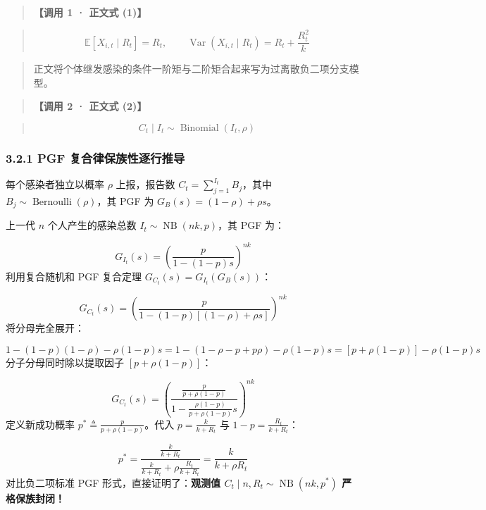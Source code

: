 \documentclass[11pt,a4paper]{ctexart}
\begin{document}
\begin{quote}\small\color{black!75}
\textbf{【调用 1 · 正文式 (1)】}
\end{quote}
\begin{quote}\small\color{black!75}
\begin{equation*}
\mathbb{E}[X_{i,t} \mid R_t] = R_t, \qquad \operatorname{Var}(X_{i,t} \mid R_t) = R_t + \frac{R_t^2}{k} \tag{eq:nb\_branching}
\end{equation*}
\end{quote}
\begin{quote}\small\color{black!75}
正文将个体继发感染的条件一阶矩与二阶矩合起来写为过离散负二项分支模型。
\end{quote}

\begin{quote}\small\color{black!75}
\textbf{【调用 2 · 正文式 (2)】}
\end{quote}
\begin{quote}\small\color{black!75}
\begin{equation*}
C_t \mid I_t \sim \operatorname{Binomial}(I_t, \rho) \tag{eq:binomial\_obs}
\end{equation*}
\end{quote}

\subsubsection{3.2.1 PGF 复合律保族性逐行推导}
每个感染者独立以概率 $\rho$ 上报，报告数 $C_t = \sum_{j=1}^{I_t} B_j$，其中 $B_j \sim \operatorname{Bernoulli}(\rho)$，其 PGF 为 $G_B(s) = (1 - \rho) + \rho s$。

上一代 $n$ 个人产生的感染总数 $I_t \sim \operatorname{NB}(nk, p)$，其 PGF 为：

\[
G_{I_t}(s) = \left(\frac{p}{1 - (1-p)s}\right)^{nk}
\]
利用复合随机和 PGF 复合定理 $G_{C_t}(s) = G_{I_t}(G_B(s))$：

\[
G_{C_t}(s) = \left( \frac{p}{1 - (1-p)[(1-\rho) + \rho s]} \right)^{nk}
\]
将分母完全展开：

\[
1 - (1-p)(1-\rho) - \rho(1-p)s = 1 - (1 - \rho - p + p\rho) - \rho(1-p)s = [p + \rho(1-p)] - \rho(1-p)s
\]
分子分母同时除以提取因子 $[p + \rho(1-p)]$：

\[
G_{C_t}(s) = \left( \frac{\frac{p}{p + \rho(1-p)}}{1 - \frac{\rho(1-p)}{p + \rho(1-p)}s} \right)^{nk}
\]
定义新成功概率 $p^* \triangleq \frac{p}{p + \rho(1-p)}$。代入 $p = \frac{k}{k+R_t}$ 与 $1-p = \frac{R_t}{k+R_t}$：

\[
p^* = \frac{\frac{k}{k + R_t}}{\frac{k}{k + R_t} + \rho \frac{R_t}{k + R_t}} = \frac{k}{k + \rho R_t}
\]
对比负二项标准 PGF 形式，直接证明了：\textbf{观测值 $C_t \mid n, R_t \sim \operatorname{NB}(nk, p^*)$ 严格保族封闭！}
\end{document}
